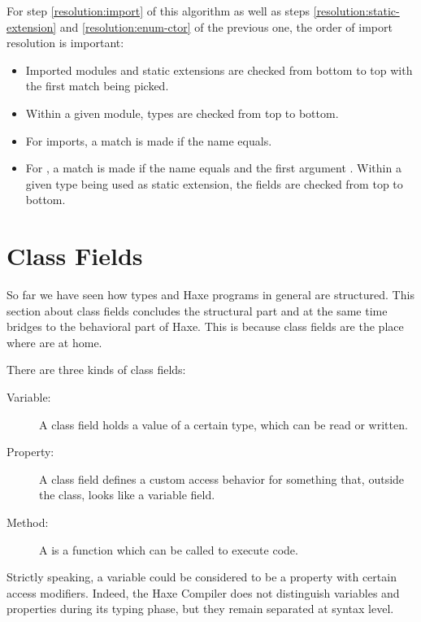 \documentclass{haxe}
\begin{document}
For step \ref{resolution:import} of this algorithm as well as steps \ref{resolution:static-extension} and \ref{resolution:enum-ctor} of the previous one, the order of import resolution is important:

\begin{itemize}
	\item Imported modules and static extensions are checked from bottom to top with the first match being picked.
	\item Within a given module, types are checked from top to bottom.
	\item For imports, a match is made if the name equals.
	\item For , a match is made if the name equals and the first argument . Within a given type being used as static extension, the fields are checked from top to bottom.
\end{itemize}




\chapter{Class Fields}
\label{class-field}


So far we have seen how types and Haxe programs in general are structured. This section about class fields concludes the structural part and at the same time bridges to the behavioral part of Haxe. This is because class fields are the place where  are at home.

There are three kinds of class fields:

\begin{description}
	\item[Variable:] A  class field holds a value of a certain type, which can be read or written.
	\item[Property:] A  class field defines a custom access behavior for something that, outside the class, looks like a variable field.
	\item[Method:] A  is a function which can be called to execute code.
\end{description}
Strictly speaking, a variable could be considered to be a property with certain access modifiers. Indeed, the Haxe Compiler does not distinguish variables and properties during its typing phase, but they remain separated at syntax level.
\end{document}
